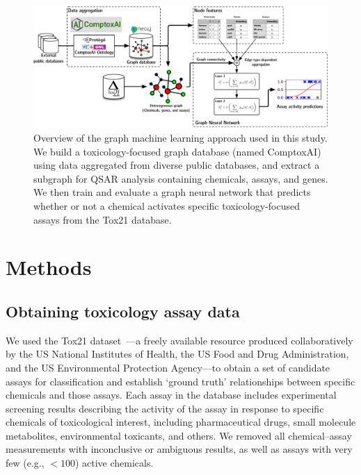 \documentclass{ws-procs11x85}
\begin{document}
\begin{figure}
   \centering
   \includegraphics[width=\textwidth]{figures/figure1.pdf}
   \caption{Overview of the graph machine learning approach used in this study. We build a toxicology-focused graph database (named ComptoxAI) using data aggregated from diverse public databases, and extract a subgraph for QSAR analysis containing chemicals, assays, and genes. We then train and evaluate a graph neural network that predicts whether or not a chemical activates specific toxicology-focused assays from the Tox21 database.}
\end{figure}

\section{Methods}

\subsection{Obtaining toxicology assay data}
We used the Tox21 dataset~\cite{tice2013improving}---a freely available resource produced collaboratively by the US National Institutes of Health, the US Food and Drug Administration, and the US Environmental Protection Agency---to obtain a set of candidate assays for classification and establish `ground truth' relationships between specific chemicals and those assays.
Each assay in the database includes experimental screening results describing the activity of the assay in response to specific chemicals of toxicological interest, including pharmaceutical drugs, small molecule metabolites, environmental toxicants, and others.
We removed all chemical--assay measurements with inconclusive or ambiguous results, as well as assays with very few (e.g., $<100$) active chemicals.
\end{document}
